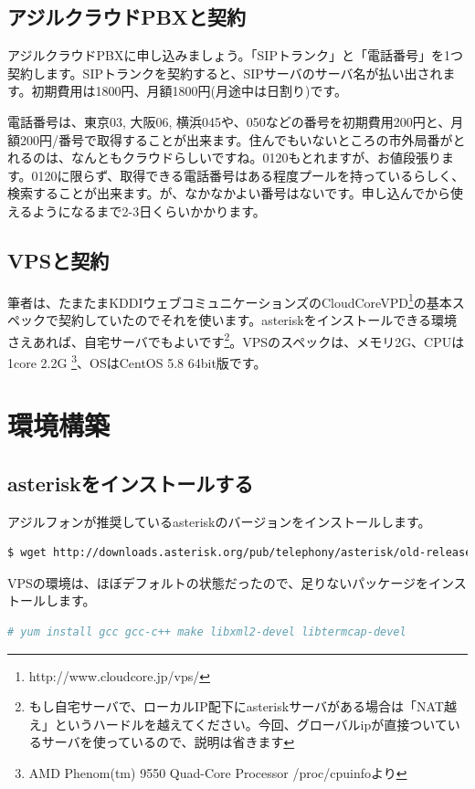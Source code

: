 \subsection{アジルクラウドPBXと契約}
アジルクラウドPBXに申し込みましょう。「SIPトランク」と「電話番号」を1つ契約します。SIPトランクを契約すると、SIPサーバのサーバ名が払い出されます。初期費用は1800円、月額1800円(月途中は日割り)です。

電話番号は、東京03, 大阪06, 横浜045や、050などの番号を初期費用200円と、月額200円/番号で取得することが出来ます。住んでもいないところの市外局番がとれるのは、なんともクラウドらしいですね。0120もとれますが、お値段張ります。0120に限らず、取得できる電話番号はある程度プールを持っているらしく、検索することが出来ます。が、なかなかよい番号はないです。申し込んでから使えるようになるまで2-3日くらいかかります。

\subsection{VPSと契約}
筆者は、たまたまKDDIウェブコミュニケーションズのCloudCoreVPD\footnote{http://www.cloudcore.jp/vps/}の基本スペックで契約していたのでそれを使います。asteriskをインストールできる環境さえあれば、自宅サーバでもよいです\footnote{もし自宅サーバで、ローカルIP配下にasteriskサーバがある場合は「NAT越え」というハードルを越えてください。今回、グローバルipが直接ついているサーバを使っているので、説明は省きます}。VPSのスペックは、メモリ2G、CPUは1core 2.2G \footnote{AMD Phenom(tm) 9550 Quad-Core Processor /proc/cpuinfoより}、OSはCentOS 5.8 64bit版です。

\section{環境構築}
\subsection{asteriskをインストールする}
アジルフォンが推奨しているasteriskのバージョンをインストールします。

\begin{lstlisting}[language=bash]
$ wget http://downloads.asterisk.org/pub/telephony/asterisk/old-releases/asterisk-1.6.2.9.tar.gz
\end{lstlisting}

VPSの環境は、ほぼデフォルトの状態だったので、足りないパッケージをインストールします。

\begin{lstlisting}[language=bash]
# yum install gcc gcc-c++ make libxml2-devel libtermcap-devel
\end{lstlisting}

